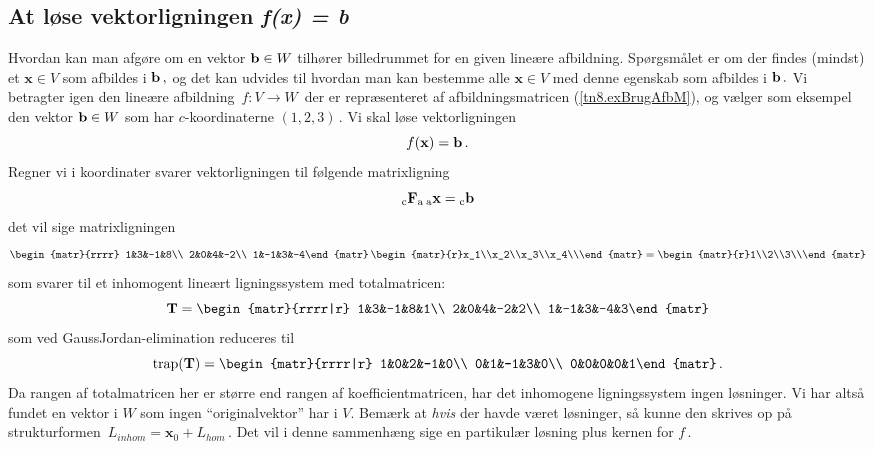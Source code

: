 \subsection{At løse vektorligningen \textit{f(x) = b}}
Hvordan kan man afgøre om en vektor $\mathbf{b} \in W$ tilhører billedrummet for en given lineære afbildning. Spørgsmålet er om der findes (mindst) et $\mathbf x \in V$ som afbildes i $\mathbf{b}\,,$ og det kan udvides til hvordan man kan bestemme alle $\mathbf x \in V$ med denne egenskab som afbildes i $\mathbf{b}\,.$\bs
Vi betragter igen den lineære afbildning $\,f:V\rightarrow W\,$ der er repræsenteret af afbildningsmatricen (\ref{tn8.exBrugAfbM}), og vælger som eksempel den vektor $\mathbf{b} \in W$ som har $c$-koordinaterne $(1,2,3)\,$. Vi skal løse vektorligningen 
$$f(\mathbf x)=\mathbf{b}\,.$$
Regner vi i koordinater svarer vektorligningen til følgende matrixligning  
$$
{_\mathrm{c}\mathbf{F}_\mathrm{a}}\,{_\mathrm{a}\mathbf{x}} = {_\mathrm{c}\mathbf{b}}$$
det vil sige matrixligningen 
$$
\begin{matr}{rrrr}
1&3&-1&8\\
2&0&4&-2\\
1&-1&3&-4\end{matr}\,
\begin{matr}{r}x_1\\x_2\\x_3\\x_4\\\end{matr}
=\begin{matr}{r}1\\2\\3\\\end{matr}
$$
som svarer til et inhomogent lineært ligningssystem med totalmatricen:
$$
\mT=
\begin{matr}{rrrr|r}
1&3&-1&8&1\\
2&0&4&-2&2\\
1&-1&3&-4&3\end{matr}
$$
som ved GaussJordan-elimination reduceres til 
$$
\mathrm{trap}(\mT)=
\begin{matr}{rrrr|r}
1&0&2&-1&0\\
0&1&-1&3&0\\
0&0&0&0&1\end{matr}\,.
$$
Da rangen af totalmatricen her er større end rangen af koefficientmatricen, har det inhomogene ligningssystem ingen løsninger. Vi har altså fundet en vektor i $W$ som ingen ``originalvektor'' har i $V$. Bemærk at \textit{hvis} der havde været løsninger, så kunne den skrives op på strukturformen 
$\,L_{inhom} = \mathbf x_0 +L_{hom}\,$. Det vil i denne sammenhæng sige en partikulær løsning plus kernen for $f\,$.

